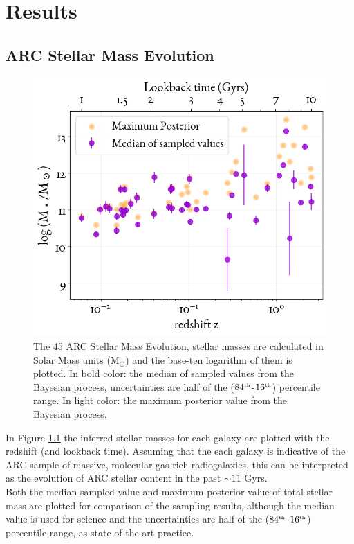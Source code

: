 \chapter{Results} \label{chp:Res}
\captionsetup{width=0.75\textwidth}


\section{ARC Stellar Mass Evolution} \label{sec:Res/ARC_M-z}
\begin{figure}[h]
    \centering
    \includegraphics[width=\linewidth]{figures/ResultPlots/MassEvol_medianANDMaxPost.png}
    \caption{The 45 ARC Stellar Mass Evolution, stellar masses are calculated in Solar Mass units (M$_\odot$) and the base-ten logarithm of them is plotted. In bold color: the median of sampled values from the Bayesian process, uncertainties are half of the ($84^{\mbox{\tiny{th}}}$-$16^{\mbox{\tiny{th}}}$) percentile range. In light color: the maximum posterior value from the Bayesian process.}
    \label{fig:StarMassEvol}
\end{figure}
In Figure \ref{fig:StarMassEvol} the inferred stellar masses for each galaxy are plotted with the redshift (and lookback time). Assuming that the each galaxy is indicative of the ARC sample of massive, molecular gas-rich radiogalaxies, this can be interpreted as the evolution of ARC stellar content in the past $\sim 11$ Gyrs. \\
Both the median sampled value and maximum posterior value of total stellar mass are plotted for comparison of the sampling results, although the median value is used for science and the uncertainties are half of the ($84^{\mbox{\tiny{th}}}$-$16^{\mbox{\tiny{th}}}$) percentile range, as state-of-the-art practice\cite{Leja2020}. 
